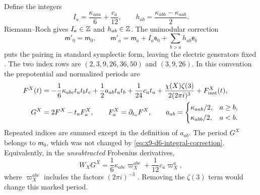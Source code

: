 Define the integers
\begin{equation}
 I_a=\frac{\kappa_{aaa}}6+\frac{c_a}{12},\qquad
 h_{ab}=\frac{\kappa_{abb}-\kappa_{aab}}2.
 \label{eq:x9-d6-rr-integers}
\end{equation}
Riemann--Roch gives $I_a\in\mathbb Z$ and $h_{ab}\in\mathbb Z$.
The unimodular correction
\begin{equation}
 \mathsf m'_0=\mathsf m_0,\qquad
 \mathsf m'_a=\mathsf m_a+I_a\mathsf e_0+\sum_{b>a}h_{ab}\mathsf e_b
 \label{eq:x9-d6-integral-correction}
\end{equation}
puts the pairing in standard symplectic form, leaving the electric
generators fixed \cite[Equations~(2.20)--(2.24)]{Demirtas:2024Mirror}.
The two index rows are $(2,3,9,26,36,50)$ and $(3,9,26)$.
In this convention the prepotential and normalized periods are
\begin{equation}
 \begin{aligned}
 F^X(t)&=-\frac16\kappa_{abc}t_at_bt_c
       +\frac12 a_{ab}t_at_b+\frac1{24}c_at_a
       +\frac{\chi(X)\zeta(3)}{2(2\pi i)^3}
       +F^X_{\rm inst}(t),\\
 G^X&=2F^X-t_aF^X_a,\qquad F^X_a=\partial_{t_a}F^X,\qquad
 a_{ab}=\begin{cases}
 \kappa_{aab}/2,&a\geq b,\\
 \kappa_{abb}/2,&a<b.
 \end{cases}
 \end{aligned}
 \label{eq:x9-d6-full-prepotential}
\end{equation}
Repeated indices are summed except in the definition of $a_{ab}$.
The period $G^X$ belongs to $\mathsf m_0$, which was not changed by
\eqref{eq:x9-d6-integral-correction}. Equivalently, in the
\emph{unsubtracted} Frobenius derivatives,
\begin{equation}
 W_XG^X=\frac16\kappa_{abc}\varpi^{abc}_X
                 +\frac1{12}c_a\varpi^a_X,
 \label{eq:x9-d6-frobenius-normalization}
\end{equation}
where $\varpi^{abc}_X$ includes the factors $(2\pi i)^{-3}$
\cite[Equations~(2.29) and~(4.19)]{Demirtas:2024Mirror}.
Removing the $\zeta(3)$ term would change this marked period.

